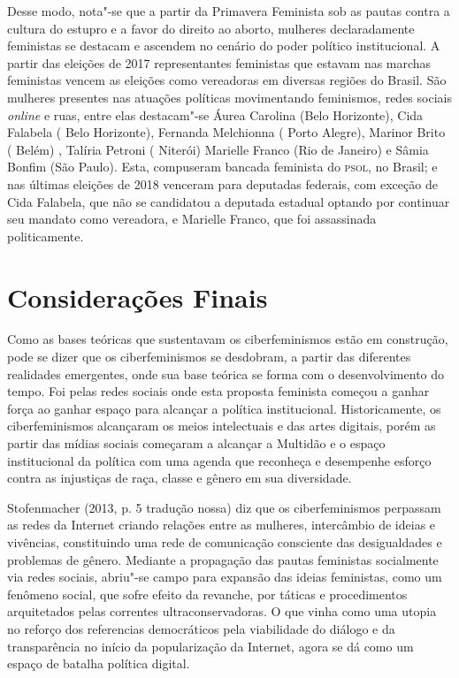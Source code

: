 Desse modo, nota"-se que a partir da Primavera Feminista sob as pautas
contra a cultura do estupro e a favor do direito ao aborto, mulheres
declaradamente feministas se destacam e ascendem no cenário do poder
político institucional. A partir das eleições de 2017 representantes
feministas que estavam nas marchas feministas vencem as eleições como
vereadoras em diversas regiões do Brasil. São mulheres presentes nas
atuações políticas movimentando feminismos, redes sociais \emph{\emph{online}} e ruas,
entre elas destacam"-se Áurea Carolina (Belo Horizonte), Cida Falabela (
Belo Horizonte), Fernanda Melchionna ( Porto Alegre), Marinor Brito (
Belém) , Talíria Petroni ( Niterói) Marielle Franco (Rio de Janeiro) e
Sâmia Bonfim (São Paulo). Esta, compuseram bancada feminista do \textsc{psol}, no
Brasil; e nas últimas eleições de 2018 venceram para deputadas federais,
com exceção de Cida Falabela, que não se candidatou a deputada estadual
optando por continuar seu mandato como vereadora, e Marielle Franco, que
foi assassinada politicamente.

\section{Considerações Finais}

\noindent{}Como as bases teóricas que sustentavam os ciberfeminismos estão em
construção, pode se dizer que os ciberfeminismos se desdobram, a partir
das diferentes realidades emergentes, onde sua base teórica se forma com
o desenvolvimento do tempo. Foi pelas redes sociais onde esta proposta
feminista começou a ganhar força ao ganhar espaço para alcançar a
política institucional. Historicamente, os ciberfeminismos alcançaram os
meios intelectuais e das artes digitais, porém as partir das mídias
sociais começaram a alcançar a Multidão e o espaço institucional da
política com uma agenda que reconheça e desempenhe esforço contra as
injustiças de raça, classe e gênero em sua diversidade.

Stofenmacher (2013, p. 5 tradução nossa) diz que os ciberfeminismos
perpassam as redes da Internet criando relações entre as mulheres,
intercâmbio de ideias e vivências, constituindo uma rede de comunicação
consciente das desigualdades e problemas de gênero. Mediante a
propagação das pautas feministas socialmente via redes sociais, abriu"-se
campo para expansão das ideias feministas, como um fenômeno social, que
sofre efeito da revanche, por táticas e procedimentos arquitetados pelas
correntes ultraconservadoras. O que vinha como uma utopia no reforço dos
referencias democráticos pela viabilidade do diálogo e da transparência
no início da popularização da Internet, agora se dá como um espaço de
batalha política digital.

